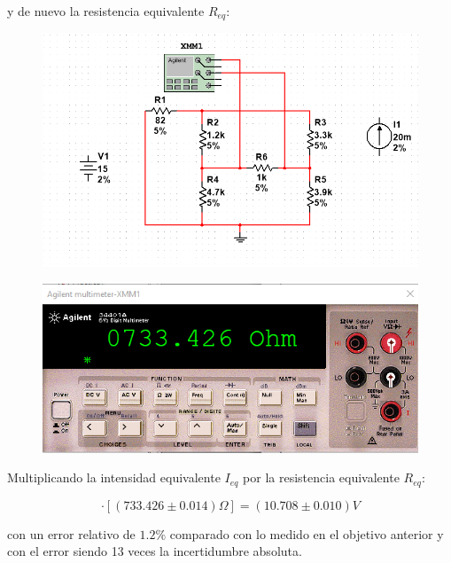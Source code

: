 \documentclass[12pt,a4paper]{article}
\begin{document}
\begin{enumerate}
y de nuevo la resistencia equivalente $R_{eq}$:

\begin{figure}[h!]
    \centering
    \includegraphics[scale=0.4]{N2.PNG}
    \label{fig:my_label}
\end{figure}

\begin{figure}[h!]
    \centering
    \includegraphics[scale=0.5]{N2.multi.PNG}
    \label{fig:my_label}
\end{figure}

Multiplicando la intensidad equivalente $I_{eq}$ por la resistencia equivalente $R_{eq}$:

\begin{equation*}
    [(14.6005 \pm 0.07) mA] \cdot [(733.426 \pm 0.014) \Omega] = (10.708\pm 0.010) V
\end{equation*}

con un error relativo de $1.2\%$ comparado con lo medido en el objetivo anterior y con el error siendo 13 veces la incertidumbre absoluta.

    
    
\end{enumerate}
\end{document}
